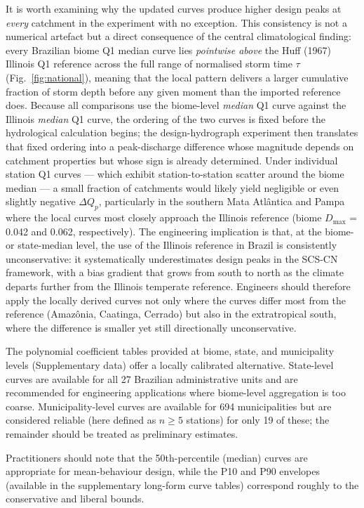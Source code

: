 \documentclass[a4paper,fleqn]{cas-sc}
\begin{document}
It is worth examining why the updated curves produce higher design peaks
at \emph{every} catchment in the experiment with no exception.
This consistency is not a numerical artefact but a direct consequence
of the central climatological finding: every Brazilian biome Q1
median curve lies \emph{pointwise above} the Huff (1967) Illinois Q1
reference across the full range of normalised storm time $\tau$
(Fig.~\ref{fig:national}), meaning that the local pattern delivers a
larger cumulative fraction of storm depth before any given moment
than the imported reference does.
Because all comparisons use the biome-level \emph{median} Q1 curve
against the Illinois \emph{median} Q1 curve, the ordering of the two
curves is fixed before the hydrological calculation begins; the
design-hydrograph experiment then translates that fixed ordering into
a peak-discharge difference whose magnitude depends on catchment
properties but whose sign is already determined.
Under individual station Q1 curves — which exhibit station-to-station
scatter around the biome median — a small fraction of catchments would
likely yield negligible or even slightly negative $\Delta Q_p$,
particularly in the southern Mata Atlântica and Pampa where the
local curves most closely approach the Illinois reference
(biome $D_\mathrm{max}$ = 0.042 and 0.062, respectively).
The engineering implication is that, at the biome- or state-median
level, the use of the Illinois reference in Brazil is consistently
unconservative: it systematically underestimates design peaks in the
SCS-CN framework, with a bias gradient that grows from south to north
as the climate departs further from the Illinois temperate reference.
Engineers should therefore apply the locally derived curves not only
where the curves differ most from the reference (Amazônia, Caatinga,
Cerrado) but also in the extratropical south, where the difference is
smaller yet still directionally unconservative.

The polynomial coefficient tables provided at biome, state, and
municipality levels (Supplementary data) offer a locally calibrated
alternative. State-level curves are available for all 27 Brazilian
administrative units and are recommended for engineering applications
where biome-level aggregation is too coarse. Municipality-level curves
are available for 694 municipalities but are considered reliable (here
defined as $n \geq 5$ stations) for only 19 of these; the remainder
should be treated as preliminary estimates.

Practitioners should note that the 50th-percentile (median) curves
are appropriate for mean-behaviour design, while the P10 and P90
envelopes (available in the supplementary long-form curve tables)
correspond roughly to the conservative and liberal bounds.
\end{document}
